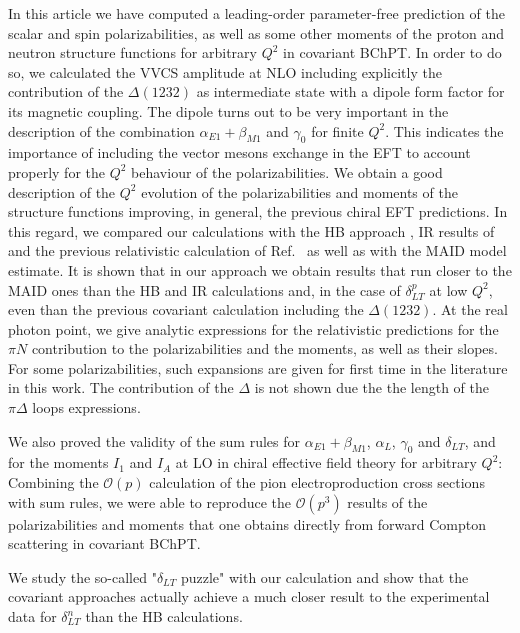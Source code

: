 \documentclass[prc,twocolumn,showpacs,preprintnumbers,amsmath,amssymb
,superscriptaddress,a4paper,nofootinbib
]{revtex4-1}
\begin{document}
In this article we have computed a leading-order parameter-free prediction of the scalar and spin polarizabilities, as well as some other moments of the proton and neutron structure functions for arbitrary $Q^2$ in covariant BChPT. 
In order to do so, we calculated the VVCS amplitude at NLO including explicitly the contribution of the $\Delta(1232)$ as intermediate state with a dipole form factor for its magnetic coupling. 
The dipole turns out to be very important in the description of the combination $\alpha_{E1}+\beta_{M1}$ and $\gamma_0$ for finite $Q^2$.
This indicates the importance of including the vector mesons exchange in the EFT to account properly for the $Q^2$ behaviour of the polarizabilities.
We obtain a good description of the $Q^2$ evolution of the polarizabilities and moments of the structure functions improving, in general, the previous chiral EFT predictions.
In this regard, we compared our calculations with the HB approach \cite{Kao:2002cp}, IR results of \cite{Bernard:2002pw} and the previous relativistic calculation of Ref.~\cite{Bernard:2012hb} as well as with the MAID model estimate. 
It is shown that in our approach we obtain results that run closer to the MAID ones than the HB and IR calculations and, in the case of $\delta^p_{LT}$ at low $Q^2$, even than the previous covariant calculation including the $\Delta(1232)$. 
At the real photon point, we give analytic expressions for the relativistic predictions for the $\pi N$ contribution to the polarizabilities and the moments, as well as their slopes.
For some polarizabilities, such expansions are given for first time in the literature in this work. 
The contribution of the $\Delta$ is not shown due the the length of the $\pi \Delta$ loops expressions.
 
We also proved the validity of the sum rules for $\alpha_{E1}+\beta_{M1}$, $\alpha_L$, $\gamma_0$ and $\delta_{LT}$, and for the moments $I_1$ and $I_A$ at LO in chiral effective field theory for arbitrary $Q^2$:
Combining the $\mathcal{O}(p)$ calculation of the pion electroproduction cross sections with sum rules, we were able to reproduce the $\mathcal{O}(p^3)$ results of the polarizabilities and moments that one obtains directly from forward Compton scattering in covariant BChPT.


We study the so-called "$\delta_{LT}$ puzzle" with our calculation and show that the covariant approaches actually achieve a much closer result to the experimental data for $\delta^n_{LT}$ than the HB calculations.
\end{document}
